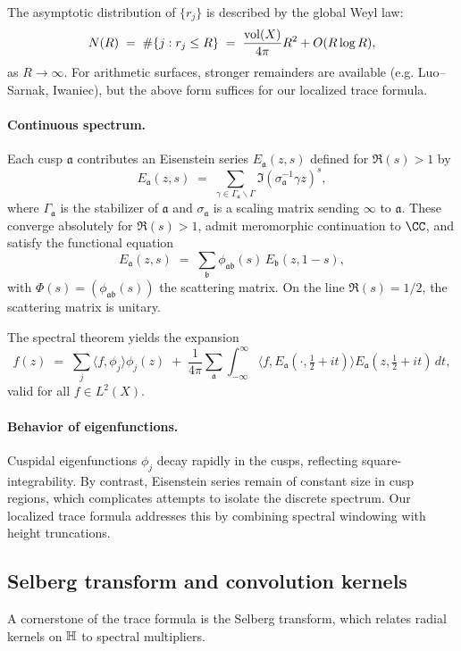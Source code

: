 The asymptotic distribution of $\{r_j\}$ is described by the global Weyl law:
\[
N(R) \;=\; \#\{j : r_j \le R\} \;=\; \frac{\operatorname{vol}(X)}{4\pi}R^2 + O(R \log R),
\]
as $R\to\infty$. For arithmetic surfaces, stronger remainders are available (e.g. Luo–Sarnak, Iwaniec), but the above form suffices for our localized trace formula.

\paragraph{Continuous spectrum.}
Each cusp $\mathfrak{a}$ contributes an Eisenstein series $E_\mathfrak{a}(z,s)$ defined for $\Re(s)>1$ by
\[
E_\mathfrak{a}(z,s) \;=\; \sum_{\gamma \in \Gamma_\mathfrak{a}\backslash \Gamma} \Im(\sigma_\mathfrak{a}^{-1}\gamma z)^s,
\]
where $\Gamma_\mathfrak{a}$ is the stabilizer of $\mathfrak{a}$ and $\sigma_\mathfrak{a}$ is a scaling matrix sending $\infty$ to $\mathfrak{a}$. These converge absolutely for $\Re(s)>1$, admit meromorphic continuation to $\CC$, and satisfy the functional equation
\[
E_\mathfrak{a}(z,s) \;=\; \sum_{\mathfrak{b}} \phi_{\mathfrak{a}\mathfrak{b}}(s)\, E_\mathfrak{b}(z,1-s),
\]
with $\Phi(s) = (\phi_{\mathfrak{a}\mathfrak{b}}(s))$ the scattering matrix. On the line $\Re(s)=1/2$, the scattering matrix is unitary. 

The spectral theorem yields the expansion
\[
f(z) \;=\; \sum_j \langle f,\phi_j\rangle \phi_j(z) \;+\; \frac{1}{4\pi}\sum_{\mathfrak{a}} \int_{-\infty}^\infty \langle f,E_\mathfrak{a}(\cdot,\tfrac12+it)\rangle E_\mathfrak{a}(z,\tfrac12+it)\,dt,
\]
valid for all $f \in L^2(X)$.

\paragraph{Behavior of eigenfunctions.}
Cuspidal eigenfunctions $\phi_j$ decay rapidly in the cusps, reflecting square-integrability. By contrast, Eisenstein series remain of constant size in cusp regions, which complicates attempts to isolate the discrete spectrum. Our localized trace formula addresses this by combining spectral windowing with height truncations.

\subsection{Selberg transform and convolution kernels}\label{subsec:selberg}

A cornerstone of the trace formula is the Selberg transform, which relates radial kernels on $\mathbb{H}$ to spectral multipliers. 

